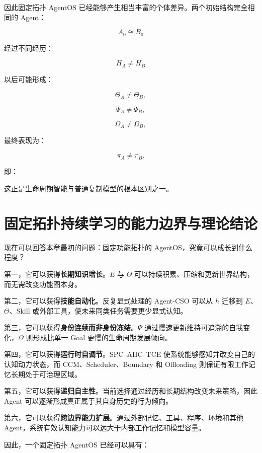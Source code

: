 因此固定拓扑 AgentOS 已经能够产生相当丰富的个体差异。两个初始结构完全相同的 Agent：

\[
A_0
\cong
B_0
\]

经过不同经历：

\[
H_A\neq H_B
\]

以后可能形成：

\[
\Theta_A\neq\Theta_B,
\]

\[
\Psi_A\neq\Psi_B,
\]

\[
\Omega_A\neq\Omega_B,
\]

最终表现为：

\[
\pi_A\neq\pi_B.
\]

即：

\begin{statementbox}
\centering
{}
\end{statementbox}

这正是生命周期智能与普通复制模型的根本区别之一。

\section{固定拓扑持续学习的能力边界与理论结论}

现在可以回答本章最初的问题：固定功能拓扑的 AgentOS，究竟可以成长到什么程度？

第一，它可以获得\textbf{长期知识增长}。$E$ 与 $\Theta$ 可以持续积累、压缩和更新世界结构，而无需改变功能图本身。

第二，它可以获得\textbf{技能自动化}。反复显式处理的 Agent-CSO 可以从 $h$ 迁移到 $E$、$\Theta$、Skill 或外部工具，使未来同类任务需要更少显式认知。

第三，它可以获得\textbf{身份连续而非身份冻结}。$\Psi$ 通过慢速更新维持可追溯的自我变化，$\Omega$ 则形成比单一 Goal 更慢的生命周期发展倾向。

第四，它可以获得\textbf{运行时自调节}。SPC--AHC--TCE 使系统能够感知并改变自己的认知动力状态，而 CCM、Scheduler、Boundary 和 Offloading 则保证有限工作记忆长期处于可治理区域。

第五，它可以获得\textbf{递归自主性}。当前选择通过经历和长期结构改变未来策略，因此 Agent 可以逐渐形成真正属于其自身历史的行为倾向。

第六，它可以获得\textbf{跨边界能力扩展}。通过外部记忆、工具、程序、环境和其他 Agent，系统有效认知能力可以远大于内部工作记忆和模型容量。

因此，一个固定拓扑 AgentOS 已经可以具有：

